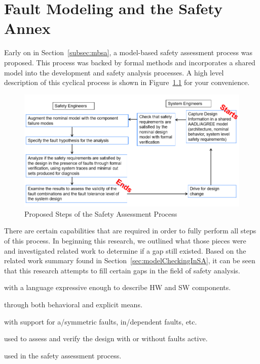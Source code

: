 \chapter{Fault Modeling and the Safety Annex}
\label{chap:faultModeling}
Early on in Section~\ref{subsec:mbsa}, a model-based safety assessment process was proposed. This process was backed by formal methods and incorporates a shared model into the development and safety analysis processes. A high level description of this cyclical process is shown in Figure~\ref{fig:SACycle} for your convenience. 

\begin{figure}[h]
	\begin{center}
		\includegraphics[width=\textwidth]{images/process4.PNG}
	\end{center}
	\caption{Proposed Steps of the Safety Assessment Process}
	\label{fig:SACycle}
\end{figure}

There are certain capabilities that are required in order to fully perform all steps of this process. In beginning this research, we outlined what those pieces were and investigated related work to determine if a gap still existed. Based on the related work summary found in Section~\ref{sec:modelCheckingInSA}, it can be seen that this research attempts to fill certain gaps in the field of safety analysis. 

\begin{description}[nosep]

    \item[Shared model] with a language expressive enough to describe HW and SW components.
    \item[Flexible error propagations] through both behavioral and explicit means.
    \item[Flexible fault modeling] with support for a/symmetric faults, in/dependent faults, etc.
    \item[Model checker] used to assess and verify the design with or without faults active.
    \item[Ability to generate artifacts] used in the safety assessment process.
\end{description}

